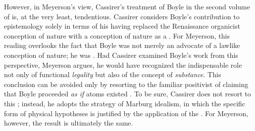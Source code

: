 \documentclass[submitted,12pt]{article}
\begin{document}
However, in Meyerson's view, Cassirer's treatment of Boyle in the second volume of \EPt is, at the very least, tendentious. Cassirer considers Boyle's contribution to epistemology solely in terms of his having replaced the Renaissance organicist conception of nature with a conception of nature as a  \citep[312--313]{Cassirer1907b}. For Meyerson, this reading overlooks the fact that Boyle was not merely an advocate of a lawlike conception of nature; he was  \citep[122--123]{Meyerson1911}. Had Cassirer examined Boyle's work from this perspective, Meyerson argues, he would have recognized the indispensable role not only of functional \emph{legality} but also of the concept of \emph{substance}. This conclusion can be avoided only by resorting to the familiar positivist  of claiming that Boyle proceeded \textit{as if} atoms existed \citep[123]{Meyerson1911}. To be sure, Cassirer does not resort to this ; instead, he adopts the strategy of Marburg idealism, in which the specific form of physical hypotheses is justified by the application of the  \citep[123]{Meyerson1911}. For Meyerson, however, the result is ultimately the same.




\end{document}
